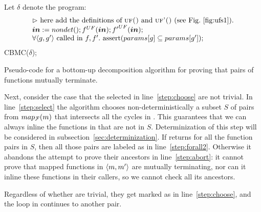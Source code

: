 \begin{algorithm}
\begin{minipage}{\linewidth}
\begin{algorithmic}[1]
\label{step:checkCallEquiv}
  \State \label{step:gen_main} Let $\delta$ denote the program:
  \[
  \begin{array}{l}
 \rhd \mbox{ here add the definitions of {\sc uf()} and {\sc uf'()} (see Fig.~\ref{fig:ufs1}).}\\
 \vec{in} := nondet(); \mtbody{f}(\vec{in}); \mtbody{f'}(\vec{in}); \\
 \forall \pair{g,g'} \mbox{ called in } f,f'.\ \mbox{assert}(params[g] \subseteq params[g']);\\
 \end{array}
 \]
  \State \Return CBMC($\delta$); \label{step:cbmc}
\EndFunction

\end{algorithmic}
\end{minipage}
\caption{Pseudo-code for a bottom-up decomposition algorithm for proving that pairs of functions mutually terminate.}
\label{alg:ProveMT}
\end{algorithm}


Next, consider the case that the selected  in line~\ref{step:choose}
are not trivial. In line~\ref{step:select} the algorithm chooses
non-deterministically a subset $S$ of pairs from $map_{\cal F}(m)$ that intersects all
the cycles in .
This guarantees that we can always inline the functions in 
that are not in $S$. Determinization of this step will be considered in
subsection~\ref{sec:determinization}. If \CheckCallEquiv returns \true for all
the function pairs in $S$, then all those pairs are labeled as \mtlabel in
line~\ref{step:forall2}. Otherwise it abandons the attempt to prove their ancestors in line~\ref{step:abort}: it cannot prove
that mapped functions in $\langle m,m'\rangle$ are mutually
terminating, nor can it inline these functions in their callers, so we cannot check all its ancestors.

Regardless of whether  are trivial, they get marked as \coverlabel
in line~\ref{step:choose}, and the loop in \ProveMT  continues to another
pair.




